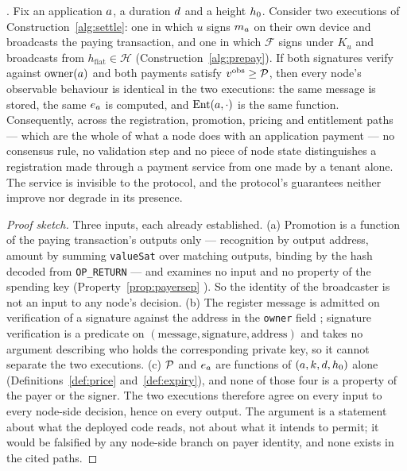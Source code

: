 \begin{property}
\label{prop:chainindifferent}
\shipped. Fix an application $a$, a duration $d$ and a height $h_0$. Consider two executions
of Construction~\ref{alg:settle}: one in which $u$ signs $m_{a}$ on their own device and broadcasts
the paying transaction, and one in which $\mathcal{F}$ signs under $K_u$ and broadcasts from
$h_{\mathrm{fiat}} \in \mathcal{H}$ (Construction~\ref{alg:prepay}). If both signatures verify
against $\mathrm{owner}(a)$ and both payments satisfy $v^{\mathrm{obs}} \ge \mathcal{P}$, then every
node's observable behaviour is identical in the two executions: the same message is stored, the same
$e_{a}$ is computed, and $\mathrm{Ent}(a,\cdot)$ is the same function. Consequently, across the
registration, promotion, pricing and entitlement paths --- which are the whole of what a node does
with an application payment --- no consensus rule, no \FluxOS validation step and no piece of node
state distinguishes a registration made through a payment service from one made by a tenant alone.
The service is invisible to the protocol, and the protocol's guarantees neither improve nor degrade
in its presence.
\end{property}

\begin{proof}[Proof sketch]
Three inputs, each already established. (a) Promotion is a function of the paying transaction's
outputs only --- recognition by output address, amount by summing \texttt{valueSat} over matching
outputs, binding by the hash decoded from \texttt{OP\_RETURN} --- and examines no input and no
property of the spending key (Property~\ref{prop:payersep}
). So the identity of the broadcaster
is not an input to any node's decision. (b) The register message is admitted on verification of a
signature against the address in the \texttt{owner} field
; signature
verification is a predicate on $(\text{message}, \text{signature}, \text{address})$ and takes no
argument describing who holds the corresponding private key, so it cannot separate the two
executions. (c) $\mathcal{P}$ and $e_{a}$ are functions of $(a, k, d, h_0)$ alone
(Definitions~\ref{def:price} and~\ref{def:expiry}), and none of those four is a property of the payer
or the signer. The two executions therefore agree on every input to every node-side decision, hence
on every output. The argument is a statement about what the deployed code reads, not about what it
intends to permit; it would be falsified by any node-side branch on payer identity, and none exists
in the cited paths.
\end{proof}

